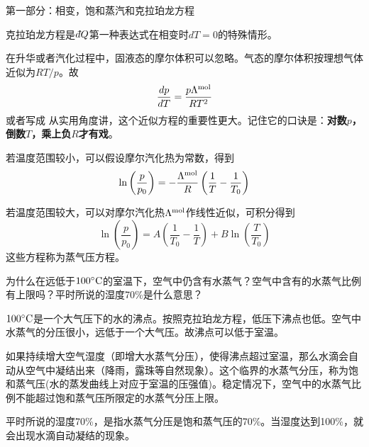 \documentclass[CJK]{beamer}
\begin{document}
\begin{frame}
  \bch
  {\Huge 第一部分：相变，饱和蒸汽和克拉珀龙方程}
  \ech
\end{frame}


\begin{frame}
  \bch
  \emini
  克拉珀龙方程是$\dbar Q$第一种表达式在相变时$dT=0$的特殊情形。
  \emini
  
  \ech
\end{frame}

\begin{frame}
  \bch
  在升华或者汽化过程中，固液态的摩尔体积可以忽略。气态的摩尔体积按理想气体近似为$RT/p$。故
  $$ \frac{dp}{dT} = \frac{p\Lambda^{\rm mol}}{RT^2}$$
  或者写成
  从实用角度讲，这个近似方程的重要性更大。记住它的口诀是：{\bf 对数$p$，倒数$T$，乘上负$R$才有戏}。
  \ech
\end{frame}


\begin{frame}
  \bch
  \bitem
  \item{
  若温度范围较小，可以假设摩尔汽化热为常数，得到
  $$\ln\left(\frac{p}{p_0}\right) = -\frac{\Lambda^{\rm mol}}{R}\left(\frac{1}{T}-\frac{1}{T_0}\right)$$
  }
  \item{若温度范围较大，可以对摩尔汽化热$\Lambda^{\rm mol}$作线性近似，可积分得到
    $$\ln\left(\frac{p}{p_0}\right) = A \left(\frac{1}{T_0} - \frac{1}{T}\right) + B \ln\left(\frac{T}{T_0}\right)$$}
    \eitem
  这些方程称为蒸气压方程。
  \ech
\end{frame}

\begin{frame}
  \chtitle{\proid (\stwo)}
  \bch
  为什么在远低于$100^\circ \mathrm{C}$的室温下，空气中仍含有水蒸气？空气中含有的水蒸气比例有上限吗？平时所说的湿度70\%是什么意思？
  \ech
\end{frame}


\begin{frame}
  \bch
  $100^\circ \mathrm{C}$是一个大气压下的水的沸点。按照克拉珀龙方程，低压下沸点也低。空气中水蒸气的分压很小，远低于一个大气压。故沸点可以低于室温。

  \skipline

  如果持续增大空气湿度（即增大水蒸气分压），使得沸点超过室温，那么水滴会自动从空气中凝结出来（降雨，露珠等自然现象）。这个临界的水蒸气分压，称为饱和蒸气压(水的蒸发曲线上对应于室温的压强值)。稳定情况下，空气中的水蒸气比例不能超过饱和蒸气压所限定的水蒸气分压上限。

  \skipline
  
  平时所说的湿度70\%，是指水蒸气分压是饱和蒸气压的70\%。当湿度达到100\%，就会出现水滴自动凝结的现象。
  \ech
\end{frame}
\end{document}
